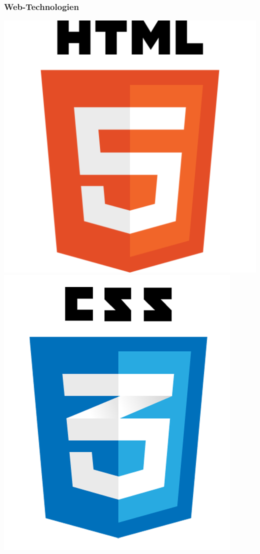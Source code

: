 \begin{frame}
\frametitle{Web-Technologien}
\begin{center}
	\includegraphics[scale=0.2]{client/HTML5_Logo.png}
	\includegraphics[scale=0.2]{client/css3logo.png}
	

\end{center}
\end{frame}
